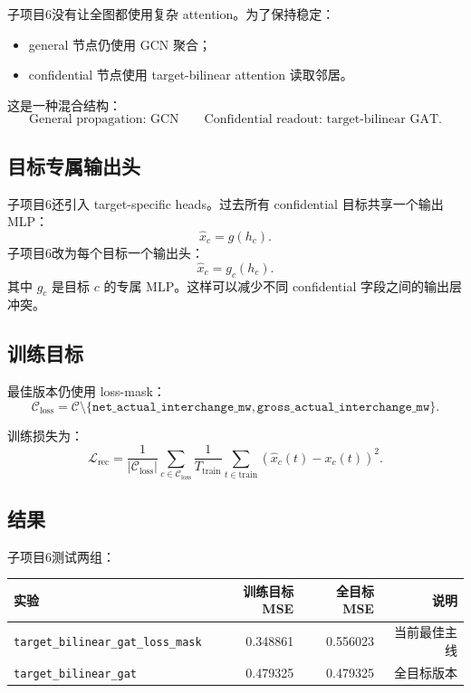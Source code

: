\documentclass[UTF8]{ctexart}
\begin{document}
子项目6没有让全图都使用复杂 attention。为了保持稳定：
\begin{itemize}
    \item general 节点仍使用 GCN 聚合；
    \item confidential 节点使用 target-bilinear attention 读取邻居。
\end{itemize}

这是一种混合结构：
\[
\text{General propagation: GCN}
\qquad
\text{Confidential readout: target-bilinear GAT}.
\]

\subsection{目标专属输出头}

子项目6还引入 target-specific heads。过去所有 confidential 目标共享一个输出 MLP：
\[
\hat{x}_c=g(h_c).
\]
子项目6改为每个目标一个输出头：
\[
\hat{x}_c=g_c(h_c).
\]
其中 \(g_c\) 是目标 \(c\) 的专属 MLP。这样可以减少不同 confidential 字段之间的输出层冲突。

\subsection{训练目标}

最佳版本仍使用 loss-mask：
\[
\mathcal{C}_{\text{loss}}
=
\mathcal{C}
\setminus
\{
\texttt{net\_actual\_interchange\_mw},
\texttt{gross\_actual\_interchange\_mw}
\}.
\]

训练损失为：
\[
\mathcal{L}_{\text{rec}}
=
\frac{1}{|\mathcal{C}_{\text{loss}}|}
\sum_{c\in\mathcal{C}_{\text{loss}}}
\frac{1}{T_{\text{train}}}
\sum_{t\in\text{train}}
(\hat{x}_c(t)-x_c(t))^2.
\]

\subsection{结果}

子项目6测试两组：

\begin{center}
\begin{tabular}{lrrr}
\toprule
实验 & 训练目标MSE & 全目标MSE & 说明 \\
\midrule
\texttt{target\_bilinear\_gat\_loss\_mask} & 0.348861 & 0.556023 & 当前最佳主线 \\
\texttt{target\_bilinear\_gat} & 0.479325 & 0.479325 & 全目标版本 \\
\bottomrule
\end{tabular}
\end{center}
\end{document}
